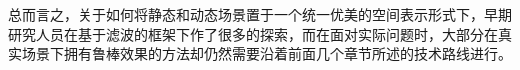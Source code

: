 总而言之，关于如何将静态和动态场景置于一个统一优美的空间表示形式下，早期研究人员在基于滤波的框架下作了很多的探索，而在面对实际问题时，大部分在真实场景下拥有鲁棒效果的方法却仍然需要沿着前面几个章节所述的技术路线进行。





